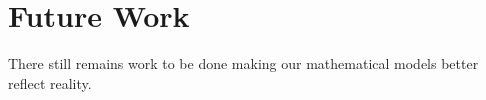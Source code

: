 \section{Future Work}

There still remains work to be done making our mathematical models better
reflect reality.
